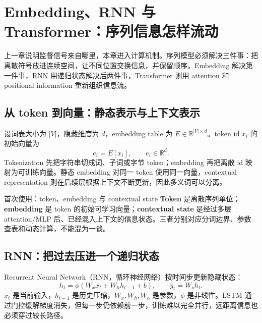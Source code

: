 \section{Embedding、RNN 与 Transformer：序列信息怎样流动}

上一章说明监督信号来自哪里，本章进入计算机制。序列模型必须解决三件事：把离散符号放进连续空间，让不同位置交换信息，并保留顺序。Embedding 解决第一件事，RNN 用递归状态解决后两件事，Transformer 则用 attention 和 positional information 重新组织信息流。

\subsection{从 token 到向量：静态表示与上下文表示}

设词表大小为 $|V|$，隐藏维度为 $d$，embedding table 为 $E\in\mathbb{R}^{|V|\times d}$。token id $x_i$ 的初始向量为
\[
e_i=E[x_i],\qquad e_i\in\mathbb{R}^{d}.
\]
Tokenization 先把字符串切成词、子词或字节 token；embedding 再把离散 id 映射为可训练向量。静态 embedding 对同一 token 使用同一向量，contextual representation 则在后续层根据上下文不断更新，因此多义词可以分离。



\begin{knowledgebox}{首次使用：token、embedding 与 contextual state}
\textbf{Token} 是离散序列单位；\textbf{embedding} 是 token 的初始可学习向量；\textbf{contextual state} 是经过多层 attention/MLP 后、已经混入上下文的信息状态。三者分别对应分词边界、参数查表和动态计算，不能混为一谈。
\end{knowledgebox}

\subsection{RNN：把过去压进一个递归状态}

Recurrent Neural Network（RNN，循环神经网络）按时间步更新隐藏状态：
\[
h_t=\phi(W_x x_t+W_h h_{t-1}+b),\qquad
\hat{y}_t=W_o h_t.
\]
$x_t$ 是当前输入，$h_{t-1}$ 是历史压缩，$W_x,W_h,W_o$ 是参数，$\phi$ 是非线性。LSTM 通过门控缓解梯度消失，但每一步仍依赖前一步，训练难以完全并行，远距离信息也必须穿过较长路径。

